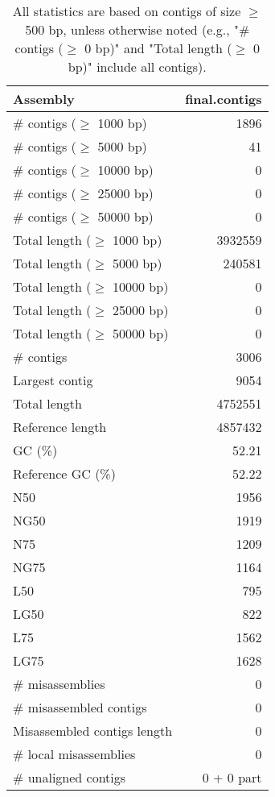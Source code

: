 \documentclass[12pt,a4paper]{article}
\begin{document}
\begin{table}[ht]
\begin{center}
\caption{All statistics are based on contigs of size $\geq$ 500 bp, unless otherwise noted (e.g., "\# contigs ($\geq$ 0 bp)" and "Total length ($\geq$ 0 bp)" include all contigs).}
\begin{tabular}{|l*{1}{|r}|}
\hline
Assembly & final.contigs \\ \hline
\# contigs ($\geq$ 1000 bp) & 1896 \\ \hline
\# contigs ($\geq$ 5000 bp) & 41 \\ \hline
\# contigs ($\geq$ 10000 bp) & 0 \\ \hline
\# contigs ($\geq$ 25000 bp) & 0 \\ \hline
\# contigs ($\geq$ 50000 bp) & 0 \\ \hline
Total length ($\geq$ 1000 bp) & 3932559 \\ \hline
Total length ($\geq$ 5000 bp) & 240581 \\ \hline
Total length ($\geq$ 10000 bp) & 0 \\ \hline
Total length ($\geq$ 25000 bp) & 0 \\ \hline
Total length ($\geq$ 50000 bp) & 0 \\ \hline
\# contigs & 3006 \\ \hline
Largest contig & 9054 \\ \hline
Total length & 4752551 \\ \hline
Reference length & 4857432 \\ \hline
GC (\%) & 52.21 \\ \hline
Reference GC (\%) & 52.22 \\ \hline
N50 & 1956 \\ \hline
NG50 & 1919 \\ \hline
N75 & 1209 \\ \hline
NG75 & 1164 \\ \hline
L50 & 795 \\ \hline
LG50 & 822 \\ \hline
L75 & 1562 \\ \hline
LG75 & 1628 \\ \hline
\# misassemblies & 0 \\ \hline
\# misassembled contigs & 0 \\ \hline
Misassembled contigs length & 0 \\ \hline
\# local misassemblies & 0 \\ \hline
\# unaligned contigs & 0 + 0 part \\ \hline

\end{tabular}
\end{center}
\end{table}
\end{document}
